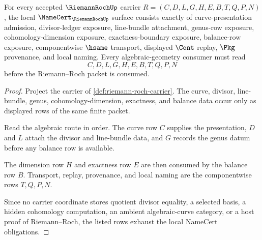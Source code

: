 \begin{theorem}
\label{thm:riemann-roch-namecert-obligations}
For every accepted $\RiemannRochUp$ carrier $R=(C,D,L,G,H,E,B,T,Q,P,N)$, the local $\NameCert_{\RiemannRochUp}$ surface consists exactly of curve-presentation admission, divisor-ledger exposure, line-bundle attachment, genus-row exposure, cohomology-dimension exposure, exactness-boundary exposure, balance-row exposure, componentwise $\hsame$ transport, displayed $\Cont$ replay, $\Pkg$ provenance, and local naming. Every algebraic-geometry consumer must read
$$
C,D,L,G,H,E,B,T,Q,P,N
$$
before the Riemann--Roch packet is consumed.
\end{theorem}
\begin{proof}
Project the carrier of \autoref{def:riemann-roch-carrier}. The curve, divisor, line-bundle, genus, cohomology-dimension, exactness, and balance data occur only as displayed rows of the same finite packet.

Read the algebraic route in order. The curve row $C$ supplies the presentation, $D$ and $L$ attach the divisor and line-bundle data, and $G$ records the genus datum before any balance row is available.

The dimension row $H$ and exactness row $E$ are then consumed by the balance row $B$. Transport, replay, provenance, and local naming are the componentwise rows $T,Q,P,N$.

Since no carrier coordinate stores quotient divisor equality, a selected basis, a hidden cohomology computation, an ambient algebraic-curve category, or a host proof of Riemann--Roch, the listed rows exhaust the local NameCert obligations.
\end{proof}




